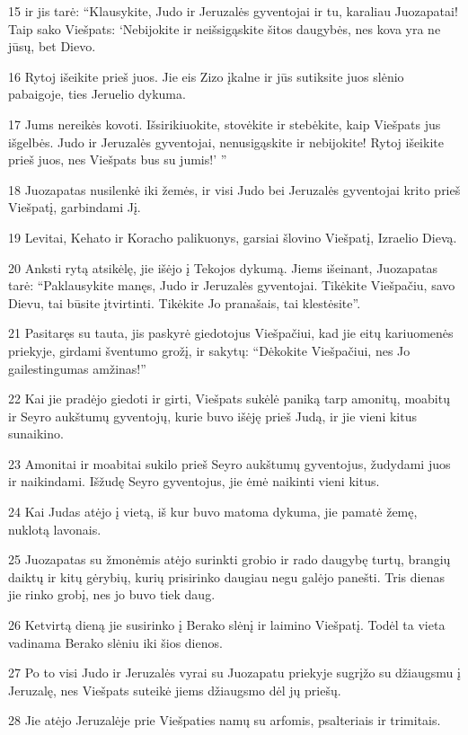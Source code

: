 \par 15 ir jis tarė: “Klausykite, Judo ir Jeruzalės gyventojai ir tu, karaliau Juozapatai! Taip sako Viešpats: ‘Nebijokite ir neišsigąskite šitos daugybės, nes kova yra ne jūsų, bet Dievo. 
\par 16 Rytoj išeikite prieš juos. Jie eis Zizo įkalne ir jūs sutiksite juos slėnio pabaigoje, ties Jeruelio dykuma. 
\par 17 Jums nereikės kovoti. Išsirikiuokite, stovėkite ir stebėkite, kaip Viešpats jus išgelbės. Judo ir Jeruzalės gyventojai, nenusigąskite ir nebijokite! Rytoj išeikite prieš juos, nes Viešpats bus su jumis!’ ” 
\par 18 Juozapatas nusilenkė iki žemės, ir visi Judo bei Jeruzalės gyventojai krito prieš Viešpatį, garbindami Jį. 
\par 19 Levitai, Kehato ir Koracho palikuonys, garsiai šlovino Viešpatį, Izraelio Dievą. 
\par 20 Anksti rytą atsikėlę, jie išėjo į Tekojos dykumą. Jiems išeinant, Juozapatas tarė: “Paklausykite manęs, Judo ir Jeruzalės gyventojai. Tikėkite Viešpačiu, savo Dievu, tai būsite įtvirtinti. Tikėkite Jo pranašais, tai klestėsite”. 
\par 21 Pasitaręs su tauta, jis paskyrė giedotojus Viešpačiui, kad jie eitų kariuomenės priekyje, girdami šventumo grožį, ir sakytų: “Dėkokite Viešpačiui, nes Jo gailestingumas amžinas!” 
\par 22 Kai jie pradėjo giedoti ir girti, Viešpats sukėlė paniką tarp amonitų, moabitų ir Seyro aukštumų gyventojų, kurie buvo išėję prieš Judą, ir jie vieni kitus sunaikino. 
\par 23 Amonitai ir moabitai sukilo prieš Seyro aukštumų gyventojus, žudydami juos ir naikindami. Išžudę Seyro gyventojus, jie ėmė naikinti vieni kitus. 
\par 24 Kai Judas atėjo į vietą, iš kur buvo matoma dykuma, jie pamatė žemę, nuklotą lavonais. 
\par 25 Juozapatas su žmonėmis atėjo surinkti grobio ir rado daugybę turtų, brangių daiktų ir kitų gėrybių, kurių prisirinko daugiau negu galėjo panešti. Tris dienas jie rinko grobį, nes jo buvo tiek daug. 
\par 26 Ketvirtą dieną jie susirinko į Berako slėnį ir laimino Viešpatį. Todėl ta vieta vadinama Berako slėniu iki šios dienos. 
\par 27 Po to visi Judo ir Jeruzalės vyrai su Juozapatu priekyje sugrįžo su džiaugsmu į Jeruzalę, nes Viešpats suteikė jiems džiaugsmo dėl jų priešų. 
\par 28 Jie atėjo Jeruzalėje prie Viešpaties namų su arfomis, psalteriais ir trimitais. 

